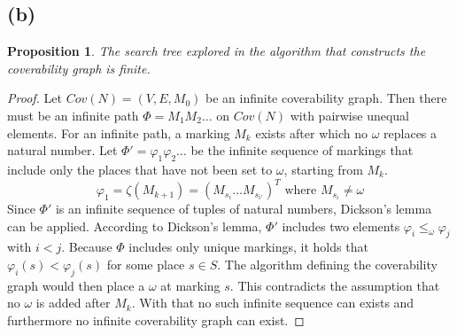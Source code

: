 \documentclass[a4paper,12pt]{article}
\renewcommand{\phi}{\varphi}
\newcounter{sheet}
\newtheorem{proposition}{Proposition}[sheet]
\begin{document}
\subsection*{(b)}
\begin{proposition}
The search tree explored in the algorithm that constructs the coverability graph is finite.
\end{proposition}
\begin{proof}
Let $Cov(N)= (V,E,M_0)$ be an infinite coverability graph. Then there must be an infinite path $\Phi = M_1M_2 \dots$ on $Cov(N)$ with pairwise unequal elements. For an infinite path, a marking $M_k$ exists after which no $\omega$ replaces a natural number. 
Let $\Phi' = \phi_{1} \phi_{2} \dots$ be the infinite sequence of markings that include only the places that have not been set to $\omega$, starting from $M_k$. 
\[\phi_1 = \zeta(M_{k+1}) = (M_{s_i} \dots M_{s_{i'}})^T \text{ where } M_{s_i} \neq \omega\]
Since $\Phi'$ is an infinite sequence of tuples of natural numbers, Dickson's lemma can be applied.
According to Dickson's lemma, $\Phi'$ includes two elements $\phi_i \leq_\omega \phi_j$ with $i < j$. Because $\Phi$ includes only unique markings, it holds that $\phi_i(s) < \phi_j(s)$ for some place $s \in S$. The algorithm defining the coverability graph would then place a $\omega$ at marking $s$. This contradicts the assumption that no $\omega$ is added after $M_k$. With that no such infinite sequence can exists and furthermore no infinite coverability graph can exist.

\end{proof}
\end{document}
